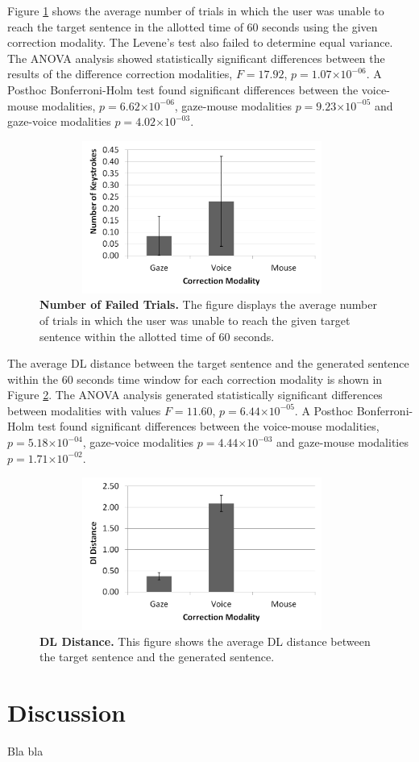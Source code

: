 \documentclass[]{article}
\providecommand{\e}[1]{\ensuremath{\times 10^{#1}}}
\begin{document}
Figure \ref{failFig} shows the average number of trials in which the user was unable to reach the target sentence in the
allotted time of 60 seconds using the given correction modality. The Levene's test also failed to determine equal
variance. The ANOVA analysis showed statistically significant differences between the results of the
difference correction modalities, $F=17.92$, $p=1.07\e{-06}$.   A Posthoc Bonferroni-Holm test found
significant differences between the voice-mouse modalities, $p=6.62\e{-06}$, gaze-mouse modalities $p=9.23\e{-05}$
and gaze-voice modalities $p=4.02\e{-03}$.

\begin{figure}[ht]
\begin{center}
\vspace{-3mm}
\includegraphics[width=0.95\textwidth,height=50mm]{figures/fail.png}
\end{center}
\caption{\textbf{Number of Failed Trials.} The figure displays the average number of trials in which the user
was unable to reach the given target sentence within the allotted time of 60 seconds.}
\label{failFig}
\end{figure}

The average DL distance between the target sentence and the generated sentence within the 60 seconds time window for
each correction modality is shown in Figure \ref{dldistance}. The ANOVA analysis generated statistically
significant differences between modalities with values $F=11.60$, $p=6.44\e{-05}$. A Posthoc Bonferroni-Holm test found
significant differences between the voice-mouse modalities, $p=5.18\e{-04}$, gaze-voice modalities $p=4.44\e{-03}$
and gaze-mouse modalities $p=1.71\e{-02}$. 

\begin{figure}[ht]
\begin{center}
\vspace{-3mm}
\includegraphics[width=0.95\textwidth,height=50mm]{figures/dldistance.png}
\end{center}
\caption{\textbf{DL Distance.} This figure shows the average DL distance between the target sentence and the generated
sentence.}
\label{dldistance}
\end{figure}


\section{Discussion}
Bla bla




\end{document}
